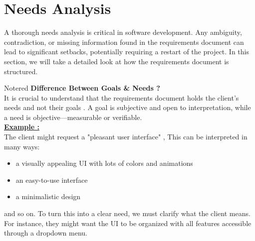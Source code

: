\section{Needs Analysis}
A thorough needs analysis is critical in software development. Any ambiguity, contradiction, or missing information found in the
requirements document can lead to significant setbacks, potentially requiring a restart of the project. In this section, we will
take a detailed look at how the requirements document is structured.

\begin{prettyBox}{Note}{red} 
\textbf{Difference Between Goals \& Needs ?}\\

It is crucial to understand that the requirements document holds the client's needs and not their goals . A goal is subjective and
open to interpretation, while a need is objective—measurable or verifiable.\\

\textbf{\underline{Example :}}\\

The client might request a "pleasant user interface" , This can be interpreted in many ways:
\begin{itemize}
    \item a visually appealing UI with lots of colors and animations   
    \item an easy-to-use interface
    \item a minimalistic design
\end{itemize} 

and so on. To turn this into a clear need, we must clarify what the client means. For instance, they might want the UI to be 
organized with all features accessible through a dropdown menu.

\end{prettyBox}

